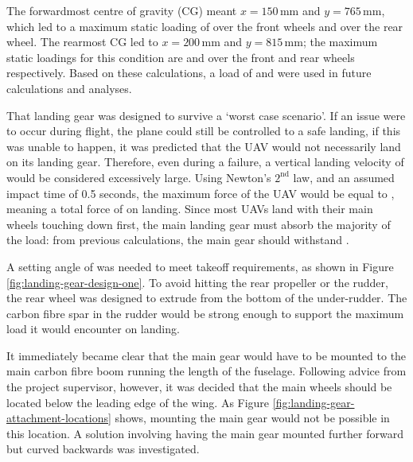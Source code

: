 \documentclass[../../main.tex]{subfiles}
\begin{document}

The forwardmost centre of gravity (CG) meant $x=150\,\mathrm{mm}$ and $y=765\,\mathrm{mm}$, which led to a maximum static loading of  over the front wheels and  over the rear wheel.
The rearmost CG led to $x=200\,\mathrm{mm}$ and $y=815\,\mathrm{mm}$; the maximum static loadings for this condition are  and  over the front and rear wheels respectively.
Based on these calculations, a load of  and  were used in future calculations and analyses. 

That landing gear was designed to survive a ‘worst case scenario’.
If an issue were to occur during flight, the plane could still be controlled to a safe landing, if this was unable to happen, it was predicted that the UAV would not necessarily land on its landing gear.
Therefore, even during a failure, a vertical landing velocity of  would be considered excessively large.
Using Newton's $2^\mathrm{nd}$ law, and an assumed impact time of 0.5 seconds, the maximum force of the UAV would be equal to , meaning a total force of  on landing.
Since most UAVs land with their main wheels touching down first, the main landing gear must absorb the majority of the load: from previous calculations, the main gear should withstand .  


A setting angle of  was needed to meet takeoff requirements, as shown in Figure \ref{fig:landing-gear-design-one}.
To avoid hitting the rear propeller or the rudder, the rear wheel was designed to extrude from the bottom of the under-rudder.
The carbon fibre spar in the rudder would be strong enough to support the maximum  load it would encounter on landing. 


It immediately became clear that the main gear would have to be mounted to the main carbon fibre boom running the length of the fuselage.
Following advice from the project supervisor, however, it was decided that the main wheels should be located below the leading edge of the wing.
As Figure \ref{fig:landing-gear-attachment-locations} shows, mounting the main gear would not be possible in this location.
A solution involving having the main gear mounted further forward but curved backwards was investigated.  
\end{document}
